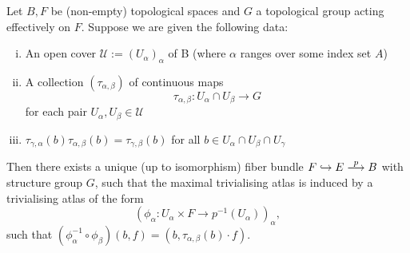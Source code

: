      \begin{theorem}
        \label{fiber_bundles:thm:fiber_bundle_construction1}
        Let $B,F$ be (non-empty) topological spaces and $G$ a topological group acting effectively on $F$. Suppose we are given the following data:
        \begin{enumerate}[(i)]
            \item An open cover $\mathcal{U} := (U_\alpha)_\alpha$ of B (where $\alpha$ ranges over some index set $A$)
            \item A collection $(\tau_{\alpha,\beta})$ of continuous maps
            \[
            \tau_{\alpha,\beta} \colon U_\alpha \cap U_\beta \to G
            \]
            for each pair $U_\alpha,U_\beta \in \mathcal{U}$
            \item $\tau_{\gamma,\alpha}(b)\tau_{\alpha,\beta}(b) = \tau_{\gamma,\beta}(b)$ for all $b \in U_\alpha \cap U_\beta \cap U_\gamma$
        \end{enumerate}
        Then there exists a unique (up to isomorphism) fiber bundle $F \hookrightarrow E \oset[0.7pt]{\scalebox{0.8}{$p$}}{\longrightarrow} B$ with structure group $G$, such that the maximal trivialising atlas is induced by a trivialising atlas of the form
        \[
        (\phi_\alpha \colon U_\alpha \times F \to p^{-1}(U_\alpha))_\alpha,
        \]
        such that $(\phi_\alpha^{-1} \circ \phi_\beta)(b,f) = (b,\tau_{\alpha,\beta}(b) \cdot f)$.
     \end{theorem}
